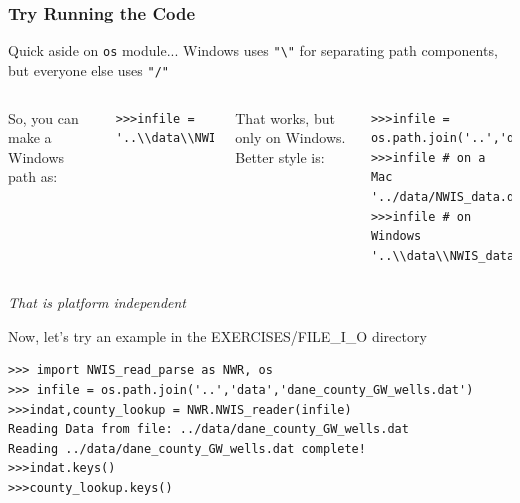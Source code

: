 \documentclass{beamer}
\begin{document}
\begin{frame}[fragile]
\frametitle{Try Running the Code}
\begin{small}
Quick aside on \texttt{os} module...
\newline{}Windows uses \texttt{"\textbackslash"} for separating path components, but everyone else uses \texttt{"/"} \\
\begin{columns}[c]

So, you can make a Windows path as:
\begin{lstlisting}
>>>infile = '..\\data\\NWIS_data.dat'
\end{lstlisting}
\pause
{}
That works, but only on Windows. Better style is:
\begin{lstlisting}
>>>infile = os.path.join('..','data','NWIS_data.dat')
>>>infile # on a Mac
'../data/NWIS_data.dat'
>>>infile # on Windows
'..\\data\\NWIS_data.dat'

\end{lstlisting}
\end{columns}
\begin{center}\emph{That is platform independent}\end{center}
\pause
Now, let's try an example in the EXERCISES/FILE\_I\_O directory
\begin{lstlisting}
>>> import NWIS_read_parse as NWR, os
>>> infile = os.path.join('..','data','dane_county_GW_wells.dat')
>>>indat,county_lookup = NWR.NWIS_reader(infile)
Reading Data from file: ../data/dane_county_GW_wells.dat
Reading ../data/dane_county_GW_wells.dat complete!
>>>indat.keys()
>>>county_lookup.keys()
\end{lstlisting}
\end{small}
\end{frame}
\end{document}

